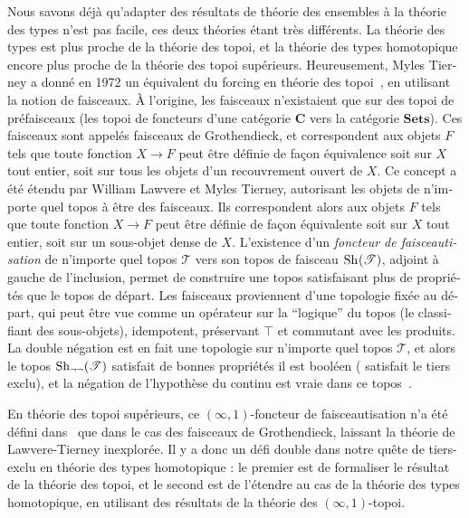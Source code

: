 \begin{otherlanguage}{french}
Nous savons déjà qu'adapter des résultats de théorie des ensembles à
la théorie des types n'est pas facile, ces deux théories étant très
différents. La théorie des types est plus proche de la théorie des
topoi, et la théorie des types homotopique encore plus proche de la
théorie des topoi supérieurs. Heureusement, Myles Tierney a donné en
1972 un équivalent du forcing en théorie des topoi~\cite{tierney1972},
en utilisant la notion de faisceaux. À l'origine, les faisceaux
n'existaient que sur des topoi de préfaisceaux (les topoi de foncteurs
d'une catégorie $\mathbf C$ vers la catégorie $\mathbf{Sets}$). Ces
faisceaux sont appelés faisceaux de Grothendieck, et correspondent aux
objets $F$ tels que toute fonction $X \to F$ peut être définie de
façon équivalence soit sur $X$ tout entier, soit sur tous les objets
d'un recouvrement ouvert de $X$. Ce concept a été étendu par William
Lawvere et Myles Tierney, autorisant les objets de n'importe quel
topos à être des faisceaux. Ils correspondent alors aux objets $F$
tels que toute fonction $X\to F$ peut être définie de façon
équivalente soit sur $X$ tout entier, soit sur un sous-objet dense de
$X$. L'existence d'un {\em foncteur de faisceautisation} de n'importe
quel topos $\mathcal T$ vers son topos de faisceau $\mathrm{Sh}_{}(\mathcal
T)$, adjoint à gauche de l'inclusion, permet de construire une topos
satisfaisant plus de propriétés que le topos de départ. Les faisceaux
proviennent d'une topologie fixée au départ, qui peut être vue comme
un opérateur sur la ``logique'' du topos (le classifiant des
sous-objets), idempotent, préservant $\top$ et commutant avec les
produits. La double négation est en fait une topologie sur n'importe
quel topos $\mathcal T$, et alors le topos $\mathrm{Sh}_{\lnot\lnot}(\mathcal
T)$ satisfait de bonnes propriétés il est booléen (\ie{} satisfait le
tiers exclu), et la négation de l'hypothèse du continu est vraie dans
ce topos~\cite{maclanemoerdijk}.

En théorie des topoi supérieurs, ce $(\infty,1)$-foncteur de
faisceautisation n'a été défini dans~\cite{lurie} que dans le cas des
faisceaux de Grothendieck, laissant la théorie de Lawvere-Tierney
inexplorée. Il y a donc un défi double dans notre quête de tiers-exclu
en théorie des types homotopique : le premier est de formaliser le
résultat de la théorie des topoi, et le second est de l'étendre au cas
de la théorie des types homotopique, en utilisant des résultats de la
théorie des $(\infty,1)$-topoi.


\end{otherlanguage}
